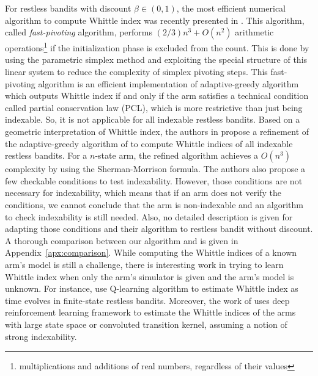 For restless bandits with discount $\beta\in(0,1)$, the most efficient numerical algorithm to compute Whittle index was recently presented in \cite{nino2020fast}. This algorithm, called \emph{fast-pivoting} algorithm,  performs $(2/3)n^3+O(n^2)$ arithmetic operations\footnote{multiplications and additions of real numbers, regardless of their values} if the initialization phase is excluded from the count.
This is done by using the parametric simplex method and  exploiting the special structure of this linear system to  reduce the complexity of simplex pivoting steps. This fast-pivoting algorithm is an efficient implementation of adaptive-greedy algorithm \cite{nino2007dynamic} which outputs Whittle index if and only if the arm satisfies a technical condition called partial conservation law (PCL), which is more restrictive than just being indexable. So, it is not applicable for all indexable restless bandits.
Based on a geometric interpretation of Whittle index, the authors in \cite{akbarzadeh2020conditions} propose a refinement of the adaptive-greedy algorithm of \cite{nino2007dynamic} to compute Whittle indices of all indexable restless bandits. For a $n$-state arm, the refined algorithm achieves a  $O(n^3)$ complexity  by using the  Sherman-Morrison formula. The authors also propose a few checkable conditions to test indexability. However, those conditions are not necessary for indexability, which means that if an arm does not verify the conditions, we cannot conclude that the arm is non-indexable and an algorithm to check indexability is still needed. Also, no detailed description is given for adapting those conditions and their algorithm to restless bandit without discount. A thorough comparison between our algorithm and \cite{akbarzadeh2020conditions,nino2020fast} is given in Appendix~\ref{apx:comparison}. 
While computing the Whittle indices of a known arm's model is still a challenge, there is interesting work in trying to learn Whittle index when only the arm's simulator is given and the arm's model is unknown. For instance, \cite{gibson2021novel, avrachenkov2022whittle, fu2019towards} use Q-learning algorithm to estimate Whittle index as time evolves in finite-state restless bandits. Moreover,
the work of \cite{nakhleh2021neurwin} uses deep reinforcement learning framework to estimate the Whittle indices of the arms with large state space or convoluted transition kernel, assuming a notion of strong indexability. 

